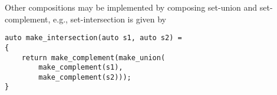 \documentclass[ ../main.tex]{subfiles}
\begin{document}



Other compositions may be implemented by composing set-union and set-complement, e.g., set-intersection is given by
\begin{verbatim}
auto make_intersection(auto s1, auto s2) =
{
    return make_complement(make_union(
        make_complement(s1),
        make_complement(s2)));
}
\end{verbatim}
\end{document}
